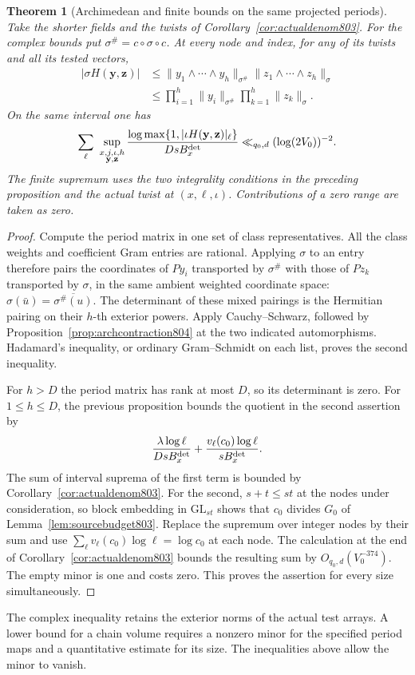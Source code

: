 \documentclass[a4paper,11pt]{article}
\newtheorem{theorem}[proposition]{Theorem}
\theoremstyle{definition}
\theoremstyle{remark}
\numberwithin{equation}{section}
\begin{document}
\begin{theorem}[Archimedean and finite bounds on the same projected periods]
\leavevmode\label{thm:actualminors804}
Take the shorter fields and the twists of
Corollary~\ref{cor:actualdenom803}. For the complex bounds put
\(\sigma^\#=c\circ\sigma\circ c\). At every node and index, for
any of its twists and all its tested vectors,
\[
 \begin{split}
 |\sigma H(\mathbf y,\mathbf z)|
  &\le \|y_1\wedge\cdots\wedge y_h\|_{\sigma^\#}
         \|z_1\wedge\cdots\wedge z_h\|_\sigma\\
  &\le \prod_{i=1}^h\|y_i\|_{\sigma^\#}
         \prod_{k=1}^h\|z_k\|_{\sigma}.
 \end{split}
\]
On the same interval one has
\[
  \sum_\ell\ \sup_{\substack{x,j,\iota,h\\\mathbf y,\mathbf z}}
     \frac{\log\max\{1,|\iota H(\mathbf y,\mathbf z)|_\ell\}}
          {D s B_x^{\rm det}}
       \ll_{q_0,d}(\log(2V_0))^{-2}.
\]
The finite supremum uses the two integrality conditions in the
preceding proposition and the actual twist at \((x,\ell,\iota)\).
Contributions of a zero range are taken as zero.
\end{theorem}
\begin{proof}
Compute the period matrix in one set of class representatives.
All the class weights and coefficient Gram entries are rational.
Applying \(\sigma\) to an entry therefore pairs the coordinates
of \(Py_i\) transported by \(\sigma^\#\) with those of \(Pz_k\)
transported by \(\sigma\), in the same ambient weighted
coordinate space: \(\sigma(\bar u)=\overline{\sigma^\#(u)}\).
The determinant of these mixed pairings is the Hermitian pairing
on their \(h\)-th exterior powers. Apply Cauchy--Schwarz,
followed by Proposition~\ref{prop:archcontraction804} at the
two indicated automorphisms. Hadamard's inequality, or ordinary
Gram--Schmidt on each list, proves the second inequality.

For \(h>D\) the period matrix has rank at most \(D\), so its
determinant is zero. For \(1\le h\le D\), the previous
proposition bounds the quotient in the second assertion by
\[
       \frac{\lambda\log\ell}{DsB_x^{\rm det}}+
       \frac{v_\ell(c_0)\log\ell}{sB_x^{\rm det}} .
\]
The sum of interval suprema of the first term is bounded by
Corollary~\ref{cor:actualdenom803}. For the second, \(s+t\le st\)
at the nodes under consideration, so block embedding in
\(\mathrm{GL}_{st}\) shows that \(c_0\) divides \(G_0\) of
Lemma~\ref{lem:sourcebudget803}. Replace the supremum over
integer nodes by their sum and use
\(\sum_\ell v_\ell(c_0)\log\ell=\log c_0\) at each node.
The calculation at the end of Corollary~\ref{cor:actualdenom803}
bounds the resulting sum by \(O_{q_0,d}(V_0^{-374})\).
The empty minor is one and costs zero. This proves the assertion
for every size simultaneously.
\end{proof}
The complex inequality retains the exterior norms of the actual
test arrays. A lower bound for a chain volume requires a nonzero
minor for the specified period maps and a quantitative estimate
for its size. The inequalities above allow the minor to vanish.
\clearpage
\end{document}
